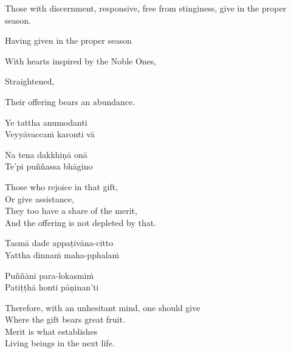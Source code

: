 \begin{english-verses}
\begin{english-hang-firstline}
    Those with discernment, responsive, free from stinginess, give in the proper season.
\end{english-hang-firstline}
\begin{english-hangtogether-verses}
  Having given in the proper season
\end{english-hangtogether-verses}
\begin{english-hangtogether-verses}
  With hearts inspired by the Noble Ones,
\end{english-hangtogether-verses}
\begin{english-hangtogether-verses}
  Straightened,
\end{english-hangtogether-verses}
\begin{english-hangtogether-verses}
  Their offering bears an abundance.
\end{english-hangtogether-verses}
\end{english-verses}

\begin{pali-hang}
  Ye tattha anumodanti\\
  Veyyāvaccaṁ karonti vā
\end{pali-hang}
\begin{pali-hangtogether}
  Na tena dakkhiṇā onā\\
  Te'pi puññassa bhāgino
\end{pali-hangtogether}

\begin{english-verses}
  Those who rejoice in that gift,\\
  Or give assistance,\\
  They too have a share of the merit,\\
  And the offering is not depleted by that.
\end{english-verses}

\begin{pali-hang}
  Tasmā dade appaṭivāna-citto\\
  Yattha dinnaṁ maha-pphalaṁ
\end{pali-hang}
\begin{pali-hangtogether}
  Puññāni para-lokasmiṁ\\
  Patiṭṭhā honti pāṇinan'ti
\end{pali-hangtogether}

\begin{english-verses}
  Therefore, with an unhesitant mind, one should give\\
  Where the gift bears great fruit.\\
  Merit is what establishes\\
  Living beings in the next life.
\end{english-verses}

